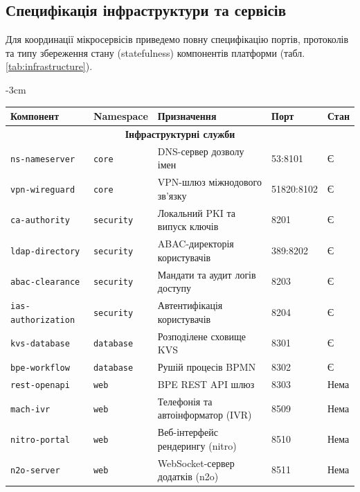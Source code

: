 \subsection{Специфікація інфраструктури та сервісів}
Для координації мікросервісів приведемо повну специфікацію портів, протоколів та типу збереження стану (statefulness) компонентів платформи (табл. \ref{tab:infrastructure}).

\begin{table}[h!]
\small
\begin{adjustwidth}{-3cm}{}
\begin{tabular}{|l|l|p{5cm}|l|l|}
\hline
\textbf{Компонент} & \textbf{Namespace} & \textbf{Призначення} & \textbf{Порт} & \textbf{Стан} \\ \hline
\multicolumn{5}{|c|}{\textbf{Інфраструктурні служби}} \\ \hline
\texttt{ns-nameserver}     & \texttt{core}      & DNS-сервер дозволу імен           & 53:8101 & Є \\ \hline
\texttt{vpn-wireguard}     & \texttt{core}      & VPN-шлюз міжнодового зв'язку      & 51820:8102 & Є \\ \hline
\texttt{ca-authority}      & \texttt{security}  & Локальний PKI та випуск ключів    & 8201 & Є \\ \hline
\texttt{ldap-directory}    & \texttt{security}  & ABAC-директорія користувачів      & 389:8202 & Є \\ \hline
\texttt{abac-clearance}    & \texttt{security}  & Мандати та аудит логів доступу    & 8203 & Є \\ \hline
\texttt{ias-authorization} & \texttt{security}  & Автентифікація користувачів       & 8204 & Є \\ \hline
\texttt{kvs-database}      & \texttt{database}  & Розподілене сховище KVS           & 8301 & Є \\ \hline
\texttt{bpe-workflow}      & \texttt{database}  & Рушій процесів BPMN               & 8302 & Є \\ \hline
\texttt{rest-openapi}      & \texttt{web}       & BPE REST API шлюз                 & 8303 & Нема \\ \hline
\texttt{mach-ivr}          & \texttt{web}       & Телефонія та автоінформатор (IVR) & 8509 & Нема \\ \hline
\texttt{nitro-portal}      & \texttt{web}       & Веб-інтерфейс рендерингу (nitro)  & 8510 & Нема \\ \hline
\texttt{n2o-server}        & \texttt{web}       & WebSocket-сервер додатків (n2o)   & 8511 & Нема \\ \hline

\end{tabular}
\end{adjustwidth}
\end{table}
